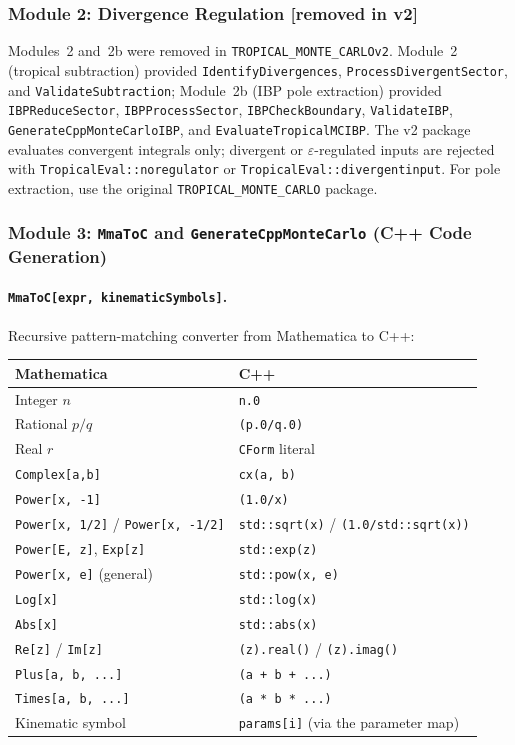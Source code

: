 \documentclass[11pt,a4paper]{article}
\begin{document}
\subsubsection{Module 2: Divergence Regulation [removed in v2]}

Modules~2 and~2b were removed in \texttt{TROPICAL\_MONTE\_CARLOv2}. Module~2 (tropical subtraction) provided \texttt{IdentifyDivergences}, \texttt{ProcessDivergentSector}, and \texttt{ValidateSubtraction}; Module~2b (IBP pole extraction) provided \texttt{IBPReduceSector}, \texttt{IBPProcessSector}, \texttt{IBPCheckBoundary}, \texttt{ValidateIBP}, \texttt{GenerateCppMonteCarloIBP}, and \texttt{EvaluateTropicalMCIBP}. The v2 package evaluates convergent integrals only; divergent or $\varepsilon$-regulated inputs are rejected with \texttt{TropicalEval::noregulator} or \texttt{TropicalEval::divergentinput}. For pole extraction, use the original \texttt{TROPICAL\_MONTE\_CARLO} package.

\subsubsection{Module 3: \texttt{MmaToC} and \texttt{GenerateCppMonteCarlo} (C++ Code Generation)}

\paragraph{\texttt{MmaToC[expr, kinematicSymbols]}.} Recursive pattern-matching converter from Mathematica to C++:

\begin{center}
\begin{tabular}{ll}
\toprule
\textbf{Mathematica} & \textbf{C++} \\
\midrule
Integer $n$ & \texttt{n.0} \\
Rational $p/q$ & \texttt{(p.0/q.0)} \\
Real $r$ & \texttt{CForm} literal \\
\texttt{Complex[a,b]} & \texttt{cx(a, b)} \\
\texttt{Power[x, -1]} & \texttt{(1.0/x)} \\
\texttt{Power[x, 1/2]} / \texttt{Power[x, -1/2]} & \texttt{std::sqrt(x)} / \texttt{(1.0/std::sqrt(x))} \\
\texttt{Power[E, z]}, \texttt{Exp[z]} & \texttt{std::exp(z)} \\
\texttt{Power[x, e]} (general) & \texttt{std::pow(x, e)} \\
\texttt{Log[x]} & \texttt{std::log(x)} \\
\texttt{Abs[x]} & \texttt{std::abs(x)} \\
\texttt{Re[z]} / \texttt{Im[z]} & \texttt{(z).real()} / \texttt{(z).imag()} \\
\texttt{Plus[a, b, ...]} & \texttt{(a + b + ...)} \\
\texttt{Times[a, b, ...]} & \texttt{(a * b * ...)} \\
Kinematic symbol & \texttt{params[i]} (via the parameter map) \\
\bottomrule
\end{tabular}
\end{center}
\end{document}
